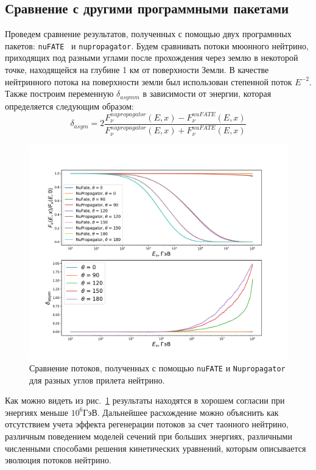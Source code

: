 \subsection{Сравнение с другими программными пакетами}
 Проведем сравнение результатов, полученных с помощью двух програмнных пакетов: \texttt{nuFATE}~\cite{Vincent_2017} и \texttt{nupropagator}. Будем сравнивать потоки мюонного нейтрино, приходящих под разными углами после прохождения через землю в некоторой точке, находящейся на глубине 1 км от поверхности Земли. В качестве нейтринного потока на поверхности земли был использован степенной поток $E^{-2}$. Также построим переменную $\delta_{asymm}$ в зависимости от энергии, которая определяется следующим образом: 
 \begin{equation}
     \delta_{asym} = 2\frac{F^{nupropagator}_{\nu}(E,x) - F^{nuFATE}_{\nu}(E,x)}{F^{nupropagator}_{\nu}(E,x) +
     F^{nuFATE}_{\nu}(E,x)}
 \end{equation}
\begin{figure}[!h]
\centering
\includegraphics[width=\linewidth]{images/NuProp/compNuandNu.pdf}
\caption{Сравнение потоков, полученных с помощью \texttt{nuFATE} и \texttt{Nupropagator} для разных углов прилета нейтрино.}
\label{fig:flux_compare}
\end{figure}
Как можно видеть из рис.~\ref{fig:flux_compare} результаты находятся в хорошем согласии при энергиях меньше $10^6$ГэВ. Дальнейшее расхождение можно объяснить как отсутствием учета эффекта регенерации потоков за счет таонного нейтрино, различным поведением моделей сечений при больших энергиях, различными численными способами решения кинетических уравнений, которым описывается эволюция потоков нейтрино.   



